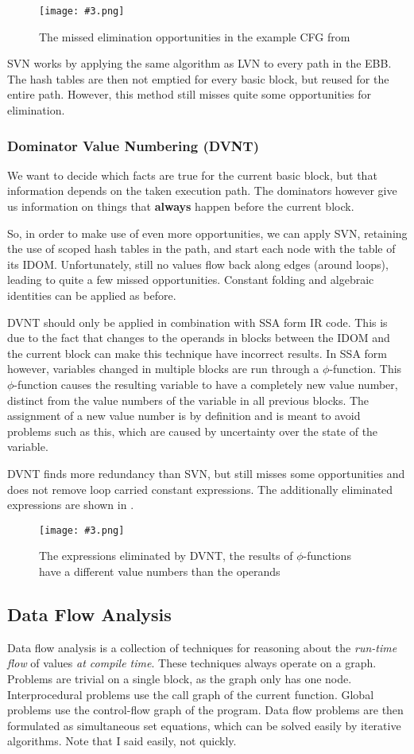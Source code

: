 \documentclass{article}
\newcommand{\fig}[4]{
	\begin{figure}[#1]
		\center
		\texttt{[image: \#3.png]}
		\caption{#4}
		\label{fig:#3}
	\end{figure}
	}
\begin{document}
\fig{h}{0.7}{missedops}{The missed elimination opportunities in the example CFG from \Cref{cfg}}

SVN works by applying the same algorithm as LVN to every path in the EBB.
The hash tables are then not emptied for every basic block, but reused for the entire path.
However, this method still misses quite some opportunities for elimination.

\subsubsection{Dominator Value Numbering (DVNT)}
We want to decide which facts are true for the current basic block, but that information depends on the taken execution path.
The dominators however give us information on things that \textbf{always} happen before the current block.

So, in order to make use of even more opportunities, we can apply SVN, retaining the use of scoped hash tables in the path, and start each node with the table of its IDOM.
Unfortunately, still no values flow back along edges (around loops), leading to quite a few missed opportunities.
Constant folding and algebraic identities can be applied as before.

DVNT should only be applied in combination with SSA form IR code.
This is due to the fact that changes to the operands in blocks between the IDOM and the current block can make this technique have incorrect results.
In SSA form however, variables changed in multiple blocks are run through a $\phi$-function.
This $\phi$-function causes the resulting variable to have a completely new value number, distinct from the value numbers of the variable in all previous blocks.
The assignment of a new value number is by definition and is meant to avoid problems such as this, which are caused by uncertainty over the state of the variable.

DVNT finds more redundancy than SVN, but still misses some opportunities and does not remove loop carried constant expressions.
The additionally eliminated expressions are shown in .

\fig{h}{0.8}{dvnt}{The expressions eliminated by DVNT, the results of $\phi$-functions have a different value numbers than the operands}

\subsection{Data Flow Analysis}
Data flow analysis is a collection of techniques for reasoning about the \emph{run-time flow} of values \emph{at compile time}.
These techniques always operate on a graph.
Problems are trivial on a single block, as the graph only has one node.
Interprocedural problems use the call graph of the current function.
Global problems use the control-flow graph of the program.
Data flow problems are then formulated as simultaneous set equations, which can be solved easily by iterative algorithms.
Note that I said easily, not quickly.
\end{document}
